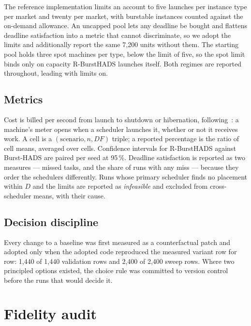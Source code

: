 \documentclass[conference]{IEEEtran}
\begin{document}
The reference implementation limits an account to five launches per instance
type per market and twenty per market, with burstable instances counted against
the on-demand allowance. An uncapped pool lets any deadline be bought and
flattens deadline satisfaction into a metric that cannot discriminate, so we
adopt the limits and additionally report the same 7{,}200 units without them.
The starting pool holds three spot machines per type, below the limit of five,
so the spot limit binds only on capacity R-BurstHADS launches itself. Both
regimes are reported throughout, leading with limits on.

\subsection{Metrics}

Cost is billed per second from launch to shutdown or hibernation,
following~\cite[\S3.1]{teylo2023}: a machine's meter opens when a scheduler
launches it, whether or not it receives work. A cell is a
$(\text{scenario}, n, DF)$ triple; a reported percentage is the ratio of cell
means, averaged over cells. Confidence intervals for R-BurstHADS against
Burst-HADS are paired per seed at 95\,\%. Deadline satisfaction is reported as
two measures --- missed tasks, and the share of runs with any miss --- because
they order the schedulers differently. Runs whose primary scheduler finds no
placement within $D$ and the limits are reported as \emph{infeasible} and
excluded from cross-scheduler means, with their cause.

\subsection{Decision discipline}

Every change to a baseline was first measured as a counterfactual patch and
adopted only when the adopted code reproduced the measured variant row for row:
1{,}440 of 1{,}440 validation rows and 2{,}400 of 2{,}400 sweep rows. Where two
principled options existed, the choice rule was committed to version control
before the runs that would decide it.

\section{Fidelity audit}
\label{sec:audit}
\end{document}
